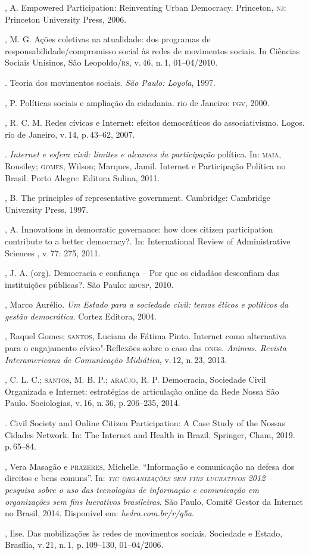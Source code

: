 \begin{bibliohedra}
, A. Empowered Participation: Reinventing Urban Democracy.
Princeton, \textsc{nj}: Princeton University Press, 2006.

, M. G. Ações coletivas na atualidade: dos programas de
responsabilidade/compromisso social às redes de movimentos sociais. In
Ciências Sociais Unisinos, São Leopoldo/\textsc{rs}, v.\,46, n.\,1, 01--04/2010.

\titidem. Teoria dos movimentos sociais. \textit{São Paulo:
Loyola}, 1997.

, P. Políticas sociais e ampliação da cidadania. rio de Janeiro:
\textsc{fgv}, 2000.

, R. C. M. Redes cívicas e Internet: efeitos democráticos do
associativismo. Logos. rio de Janeiro, v.\,14, p.\,43--62, 2007.

\titidem. \textit{Internet e esfera civil: limites e alcances da
participação} política. In: \textsc{maia}, Rousiley; \textsc{gomes}, Wilson; Marques,
Jamil. Internet e Participação Política no Brasil. Porto Alegre: Editora
Sulina, 2011.

, B. The principles of representative government. Cambridge:
Cambridge University Press, 1997.

, A. Innovations in democratic governance: how does citizen
participation contribute to a better democracy?. In: International
Review of Administrative Sciences , v.\,77: 275, 2011.

, J. A. (org). Democracia e confiança -- Por que os cidadãos
desconfiam das instituições públicas?. São Paulo: \textsc{edusp}, 2010.

, Marco Aurélio. \textit{Um Estado para a sociedade civil: temas
éticos e políticos da gestão democrática}. Cortez Editora, 2004.

, Raquel Gomes; \textsc{santos}, Luciana de Fátima Pinto. Internet como
alternativa para o engajamento cívico"-Reflexões sobre o caso das \textsc{ong}s.
\textit{Animus. Revista Interamericana de Comunicação Midiática}, v.\,12,
n.\,23, 2013.

, C. L. C.; \textsc{santos}, M. B. P.; \textsc{araújo}, R. P. Democracia,
Sociedade Civil Organizada e Internet: estratégias de articulação online
da Rede Nossa São Paulo. Sociologias, v.\,16, n.\,36, p.\,206--235, 2014.

\titidem. Civil Society and Online Citizen Participation:
A Case Study of the Nossas Cidades Network. In: The Internet and Health
in Brazil. Springer, Cham, 2019. p.\,65--84.

, Vera Masagão e \textsc{prazeres}, Michelle. ``Informação e comunicação
na defesa dos direitos e bens comuns''. In: \textit{\textsc{tic organizações sem
fins lucrativos} 2012 -- pesquisa sobre o uso das tecnologias de
informação e comunicação em organizações sem fins lucrativos
brasileiras}. São Paulo, Comitê Gestor da Internet no Brasil, 2014.
Disponível em: \textit{hedra.com.br/r/q5a}.

, Ilse. Das mobilizações às redes de movimentos sociais.
Sociedade e Estado, Brasília, v.\,21, n.\,1, p.\,109--130, 01--04/2006.
\end{bibliohedra}

